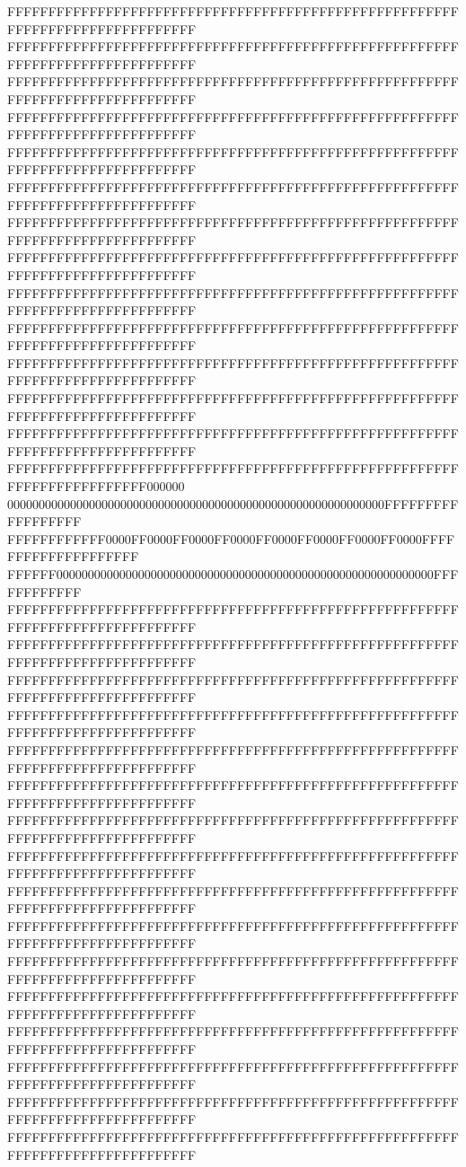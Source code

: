 FFFFFFFFFFFFFFFFFFFFFFFFFFFFFFFFFFFFFFFFFFFFFFFFFFFFFFFFFFFFFFFFFFFFFFFFFFFFFF
FFFFFFFFFFFFFFFFFFFFFFFFFFFFFFFFFFFFFFFFFFFFFFFFFFFFFFFFFFFFFFFFFFFFFFFFFFFFFF
FFFFFFFFFFFFFFFFFFFFFFFFFFFFFFFFFFFFFFFFFFFFFFFFFFFFFFFFFFFFFFFFFFFFFFFFFFFFFF
FFFFFFFFFFFFFFFFFFFFFFFFFFFFFFFFFFFFFFFFFFFFFFFFFFFFFFFFFFFFFFFFFFFFFFFFFFFFFF
FFFFFFFFFFFFFFFFFFFFFFFFFFFFFFFFFFFFFFFFFFFFFFFFFFFFFFFFFFFFFFFFFFFFFFFFFFFFFF
FFFFFFFFFFFFFFFFFFFFFFFFFFFFFFFFFFFFFFFFFFFFFFFFFFFFFFFFFFFFFFFFFFFFFFFFFFFFFF
FFFFFFFFFFFFFFFFFFFFFFFFFFFFFFFFFFFFFFFFFFFFFFFFFFFFFFFFFFFFFFFFFFFFFFFFFFFFFF
FFFFFFFFFFFFFFFFFFFFFFFFFFFFFFFFFFFFFFFFFFFFFFFFFFFFFFFFFFFFFFFFFFFFFFFFFFFFFF
FFFFFFFFFFFFFFFFFFFFFFFFFFFFFFFFFFFFFFFFFFFFFFFFFFFFFFFFFFFFFFFFFFFFFFFFFFFFFF
FFFFFFFFFFFFFFFFFFFFFFFFFFFFFFFFFFFFFFFFFFFFFFFFFFFFFFFFFFFFFFFFFFFFFFFFFFFFFF
FFFFFFFFFFFFFFFFFFFFFFFFFFFFFFFFFFFFFFFFFFFFFFFFFFFFFFFFFFFFFFFFFFFFFFFFFFFFFF
FFFFFFFFFFFFFFFFFFFFFFFFFFFFFFFFFFFFFFFFFFFFFFFFFFFFFFFFFFFFFFFFFFFFFFFFFFFFFF
FFFFFFFFFFFFFFFFFFFFFFFFFFFFFFFFFFFFFFFFFFFFFFFFFFFFFFFFFFFFFFFFFFFFFFFFFFFFFF
FFFFFFFFFFFFFFFFFFFFFFFFFFFFFFFFFFFFFFFFFFFFFFFFFFFFFFFFFFFFFFFFFFFFFFFF000000
000000000000000000000000000000000000000000000000000000000000FFFFFFFFFFFFFFFFFF
FFFFFFFFFFFF0000FF0000FF0000FF0000FF0000FF0000FF0000FF0000FFFFFFFFFFFFFFFFFFFF
FFFFFF000000000000000000000000000000000000000000000000000000000000FFFFFFFFFFFF
FFFFFFFFFFFFFFFFFFFFFFFFFFFFFFFFFFFFFFFFFFFFFFFFFFFFFFFFFFFFFFFFFFFFFFFFFFFFFF
FFFFFFFFFFFFFFFFFFFFFFFFFFFFFFFFFFFFFFFFFFFFFFFFFFFFFFFFFFFFFFFFFFFFFFFFFFFFFF
FFFFFFFFFFFFFFFFFFFFFFFFFFFFFFFFFFFFFFFFFFFFFFFFFFFFFFFFFFFFFFFFFFFFFFFFFFFFFF
FFFFFFFFFFFFFFFFFFFFFFFFFFFFFFFFFFFFFFFFFFFFFFFFFFFFFFFFFFFFFFFFFFFFFFFFFFFFFF
FFFFFFFFFFFFFFFFFFFFFFFFFFFFFFFFFFFFFFFFFFFFFFFFFFFFFFFFFFFFFFFFFFFFFFFFFFFFFF
FFFFFFFFFFFFFFFFFFFFFFFFFFFFFFFFFFFFFFFFFFFFFFFFFFFFFFFFFFFFFFFFFFFFFFFFFFFFFF
FFFFFFFFFFFFFFFFFFFFFFFFFFFFFFFFFFFFFFFFFFFFFFFFFFFFFFFFFFFFFFFFFFFFFFFFFFFFFF
FFFFFFFFFFFFFFFFFFFFFFFFFFFFFFFFFFFFFFFFFFFFFFFFFFFFFFFFFFFFFFFFFFFFFFFFFFFFFF
FFFFFFFFFFFFFFFFFFFFFFFFFFFFFFFFFFFFFFFFFFFFFFFFFFFFFFFFFFFFFFFFFFFFFFFFFFFFFF
FFFFFFFFFFFFFFFFFFFFFFFFFFFFFFFFFFFFFFFFFFFFFFFFFFFFFFFFFFFFFFFFFFFFFFFFFFFFFF
FFFFFFFFFFFFFFFFFFFFFFFFFFFFFFFFFFFFFFFFFFFFFFFFFFFFFFFFFFFFFFFFFFFFFFFFFFFFFF
FFFFFFFFFFFFFFFFFFFFFFFFFFFFFFFFFFFFFFFFFFFFFFFFFFFFFFFFFFFFFFFFFFFFFFFFFFFFFF
FFFFFFFFFFFFFFFFFFFFFFFFFFFFFFFFFFFFFFFFFFFFFFFFFFFFFFFFFFFFFFFFFFFFFFFFFFFFFF
FFFFFFFFFFFFFFFFFFFFFFFFFFFFFFFFFFFFFFFFFFFFFFFFFFFFFFFFFFFFFFFFFFFFFFFFFFFFFF
FFFFFFFFFFFFFFFFFFFFFFFFFFFFFFFFFFFFFFFFFFFFFFFFFFFFFFFFFFFFFFFFFFFFFFFFFFFFFF
FFFFFFFFFFFFFFFFFFFFFFFFFFFFFFFFFFFFFFFFFFFFFFFFFFFFFFFFFFFFFFFFFFFFFFFFFFFFFF
